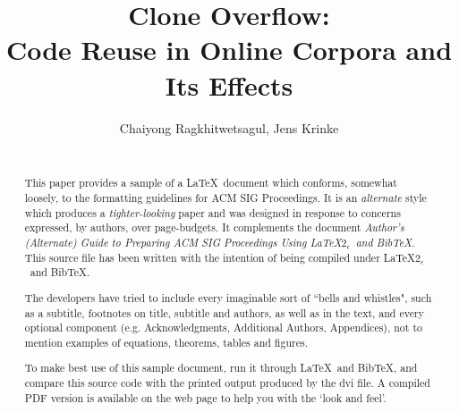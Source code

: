 \documentclass{sig-alternate-05-2015}
\begin{document}






%

\title{Clone Overflow: \\ Code Reuse in Online Corpora and Its Effects}

\author{
	\alignauthor
	Chaiyong Ragkhitwetsagul, Jens Krinke \\
	\\
}

\maketitle
\begin{abstract}
This paper provides a sample of a \LaTeX\ document which conforms,
somewhat loosely, to the formatting guidelines for
ACM SIG Proceedings. It is an {\em alternate} style which produces
a {\em tighter-looking} paper and was designed in response to
concerns expressed, by authors, over page-budgets.
It complements the document \textit{Author's (Alternate) Guide to
Preparing ACM SIG Proceedings Using \LaTeX$2_\epsilon$\ and Bib\TeX}.
This source file has been written with the intention of being
compiled under \LaTeX$2_\epsilon$\ and BibTeX.

The developers have tried to include every imaginable sort
of ``bells and whistles", such as a subtitle, footnotes on
title, subtitle and authors, as well as in the text, and
every optional component (e.g. Acknowledgments, Additional
Authors, Appendices), not to mention examples of
equations, theorems, tables and figures.

To make best use of this sample document, run it through \LaTeX\
and BibTeX, and compare this source code with the printed
output produced by the dvi file. A compiled PDF version
is available on the web page to help you with the
`look and feel'.
\end{abstract}
\end{document}
